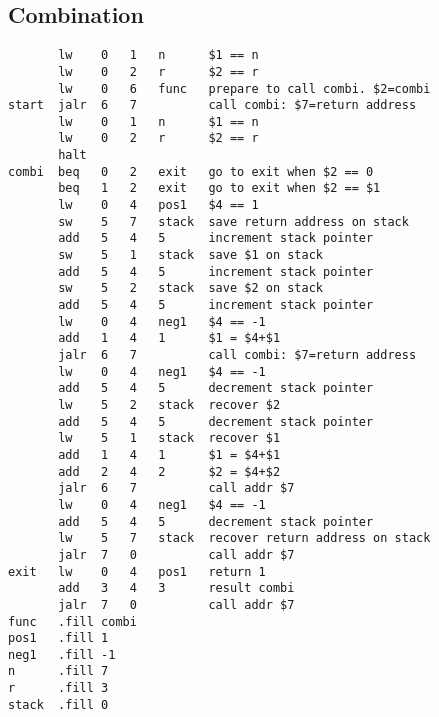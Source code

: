 \documentclass[14pt]{article}
\begin{document}
\subsection{Combination}
\begin{lstlisting}
       lw    0   1   n      $1 == n 
       lw    0   2   r      $2 == r
       lw    0   6   func   prepare to call combi. $2=combi 
start  jalr  6   7          call combi: $7=return address
       lw    0   1   n      $1 == n
       lw    0   2   r      $2 == r
       halt
combi  beq   0   2   exit   go to exit when $2 == 0
       beq   1   2   exit   go to exit when $2 == $1
       lw    0   4   pos1   $4 == 1
       sw    5   7   stack  save return address on stack
       add   5   4   5      increment stack pointer
       sw    5   1   stack  save $1 on stack
       add   5   4   5      increment stack pointer
       sw    5   2   stack  save $2 on stack
       add   5   4   5      increment stack pointer
       lw    0   4   neg1   $4 == -1
       add   1   4   1      $1 = $4+$1
       jalr  6   7          call combi: $7=return address
       lw    0   4   neg1   $4 == -1
       add   5   4   5      decrement stack pointer
       lw    5   2   stack  recover $2
       add   5   4   5      decrement stack pointer
       lw    5   1   stack  recover $1
       add   1   4   1      $1 = $4+$1
       add   2   4   2      $2 = $4+$2
       jalr  6   7          call addr $7
       lw    0   4   neg1   $4 == -1
       add   5   4   5      decrement stack pointer
       lw    5   7   stack  recover return address on stack
       jalr  7   0          call addr $7
exit   lw    0   4   pos1   return 1
       add   3   4   3      result combi
       jalr  7   0          call addr $7
func   .fill combi
pos1   .fill 1
neg1   .fill -1
n      .fill 7
r      .fill 3
stack  .fill 0
    
\end{lstlisting}
\end{document}
